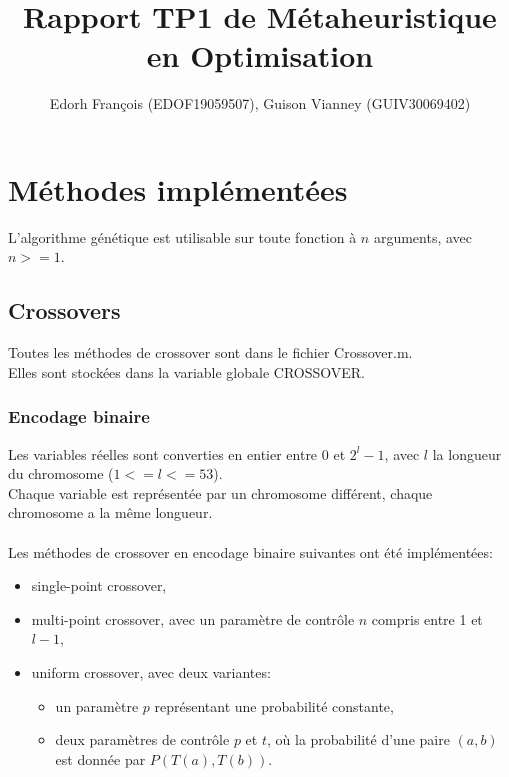 \documentclass[12pt, letterpaper]{article}
\author{Edorh François (EDOF19059507), Guison Vianney (GUIV30069402)}
\title{Rapport TP1 de Métaheuristique en Optimisation}
\begin{document}
\maketitle
\tableofcontents
\newpage

\section{Méthodes implémentées}
L'algorithme génétique est utilisable sur toute fonction à $n$
arguments, avec $n >= 1$.

\subsection{Crossovers}

Toutes les méthodes de crossover sont dans le fichier Crossover.m.\\
Elles sont stockées dans la variable globale CROSSOVER.

\subsubsection{Encodage binaire}
Les variables réelles sont converties en entier entre 0 et $2^l-1$,
avec $l$ la longueur du chromosome ($1 <= l <= 53$).
\\
Chaque variable est représentée par un chromosome différent, chaque
chromosome a la même longueur.
\\
\\
Les méthodes de crossover en encodage binaire suivantes ont été
implémentées:
\begin{itemize}
\item single-point crossover,
  
\item multi-point crossover, avec un paramètre de contrôle $n$ compris
entre 1 et $l - 1$,
  
\item uniform crossover, avec deux variantes:
  \begin{itemize}
  \item un paramètre $p$ représentant une probabilité constante,
    
  \item deux paramètres de contrôle $p$ et $t$, où la probabilité
    d'une paire $(a, b)$ est donnée par $P(T(a), T(b))$.
    
  \end{itemize}
\end{itemize}
\end{document}
